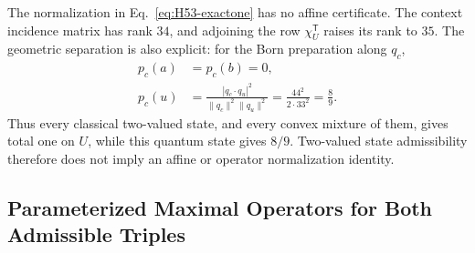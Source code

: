 \documentclass[aps,pra,reprint,superscriptaddress,longbibliography,nofootinbib,floatfix,10pt]{revtex4-2}
\theoremstyle{definition}\newtheorem{definition}[theorem]{Definition}
\theoremstyle{remark}\newtheorem{remark}[theorem]{Remark}
\begin{document}
The normalization in Eq.~\eqref{eq:H53-exactone} has no affine certificate. The context incidence matrix has rank $34$, and adjoining the row $\chi_U^{\mathsf T}$ raises its rank to $35$. The geometric separation is also explicit: for the Born preparation along $q_c$,
\begin{equation}\label{eq:H53-Born-separation}
\begin{aligned}
p_c(a)&=p_c(b)=0,\\
p_c(u)&=\frac{|q_c\cdot q_u|^2}{\|q_c\|^2\|q_u\|^2}
=\frac{44^2}{2\cdot33^2}=\frac89.
\end{aligned}
\end{equation}
Thus every classical two-valued state, and every convex mixture of them, gives total one on $U$, while this quantum state gives $8/9$. Two-valued state admissibility therefore does not imply an affine or operator normalization identity.


\subsection{Parameterized Maximal Operators for Both Admissible Triples}\label{sec:weighted-H53}
\end{document}
